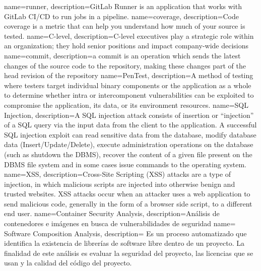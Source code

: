 {
        name=runner,
        description={GitLab Runner is an application that works with GitLab CI/CD to run jobs in a pipeline.}
}
{
        name=coverage,
        description={Code coverage is a metric that can help you understand how much of your source is tested.}
}
{
        name=C-level,
        description={C-level executives play a strategic role within an organization; they hold senior positions and impact company-wide decisions}
}
{
       name=commit,
       description={a commit is an operation which sends the latest changes of the source code to the repository, making these changes part of the head revision of the repository}
}
{
        name=PenTest,
        description={A method of testing where testers target individual binary components or the application as a whole to determine whether intra or intercomponent vulnerabilities can be exploited to compromise the application, its data, or its environment resources.}
}
{
        name=SQL Injection,
        description={A SQL injection attack consists of insertion or “injection” of a SQL query via the input data from the client to the application. A successful SQL injection exploit can read sensitive data from the database, modify database data (Insert/Update/Delete), execute administration operations on the database (such as shutdown the DBMS), recover the content of a given file present on the DBMS file system and in some cases issue commands to the operating system.}
}
{
        name=XSS,
        description={Cross-Site Scripting (XSS) attacks are a type of injection, in which malicious scripts are injected into otherwise benign and trusted websites. XSS attacks occur when an attacker uses a web application to send malicious code, generally in the form of a browser side script, to a different end user.}
}
{
        name=Container Security Analysis,
        description={Análisis de contenedores e imágenes en busca de
        vulnerabilidades de seguridad}
}
{
        name= Software Composition Analysis,
        description= {Es un proceso automatizado que identifica la existencia de
        librerías de software libre dentro de un proyecto. La finalidad de este
        análisis es evaluar la seguridad del proyecto, las licencias que se usan
        y la calidad del código del proyecto.}
}

